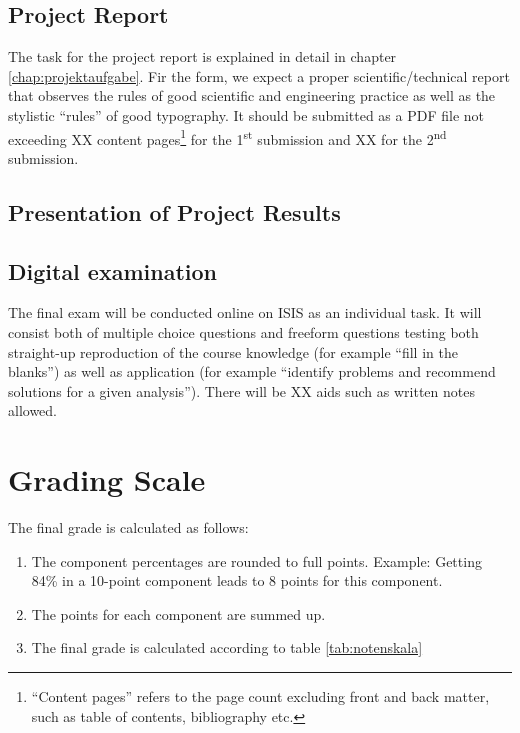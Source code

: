 \documentclass[headinclude=true]{scrreprt}
\begin{document}
\subsection{Project Report}

The task for the project report is explained in detail in chapter \ref{chap:projektaufgabe}. Fir the form, we expect a proper scientific/technical report that observes the rules of good scientific and engineering practice as well as the stylistic ``rules'' of good typography. It should be submitted as a PDF file not exceeding XX content pages\footnote{``Content pages'' refers to the page count excluding front and back matter, such as table of contents, bibliography etc.} for the 1\textsuperscript{st} submission and XX for the 2\textsuperscript{nd} submission.

\subsection{Presentation of Project Results}


\subsection{Digital examination}

The final exam will be conducted online on ISIS as an individual task. It will consist both of multiple choice questions and freeform questions testing both straight-up reproduction of the course knowledge (for example ``fill in the blanks'') as well as application (for example ``identify problems and recommend solutions for a given analysis''). There will be XX aids such as written notes allowed.

\section{Grading Scale}

The final grade is calculated as follows:

\begin{enumerate}
 \item The component percentages are rounded to full points. Example: Getting 84\% in a 10-point component leads to 8 points for this component.
 \item The points for each component are summed up.
 \item The final grade is calculated according to table \ref{tab:notenskala}
\end{enumerate}
\end{document}
